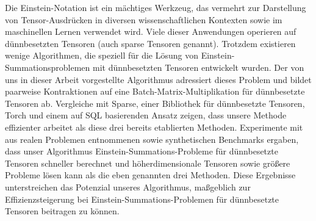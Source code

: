Die Einstein-Notation ist ein mächtiges Werkzeug, das vermehrt zur Darstellung von Tensor-Ausdrücken
in diversen wissenschaftlichen Kontexten sowie im maschinellen Lernen verwendet wird. Viele dieser
Anwendungen operieren auf dünnbesetzten Tensoren (auch sparse Tensoren genannt). Trotzdem existieren wenige
Algorithmen, die speziell für die Lösung von Einstein-Summationsproblemen mit dünnbesetzten Tensoren
entwickelt wurden. Der von uns in dieser Arbeit vorgestellte Algorithmus adressiert dieses Problem und
bildet paarweise Kontraktionen auf eine Batch-Matrix-Multiplikation
für dünnbesetzte Tensoren ab. Vergleiche mit Sparse, einer Bibliothek für dünnbesetzte Tensoren, Torch und
einem auf SQL basierenden Ansatz zeigen, dass unsere Methode effizienter arbeitet als diese drei bereits
etablierten Methoden. Experimente mit aus realen Problemen entnommenen sowie synthetischen Benchmarks
ergaben, dass unser Algorithmus Einstein-Summations-Probleme für dünnbesetzte Tensoren schneller berechnet
und höherdimensionale Tensoren sowie größere Probleme lösen kann als die eben genannten drei Methoden.
Diese Ergebnisse unterstreichen das Potenzial unseres Algorithmus, maßgeblich zur Effizienzsteigerung
bei Einstein-Summations-Problemen für dünnbesetzte Tensoren beitragen zu können.